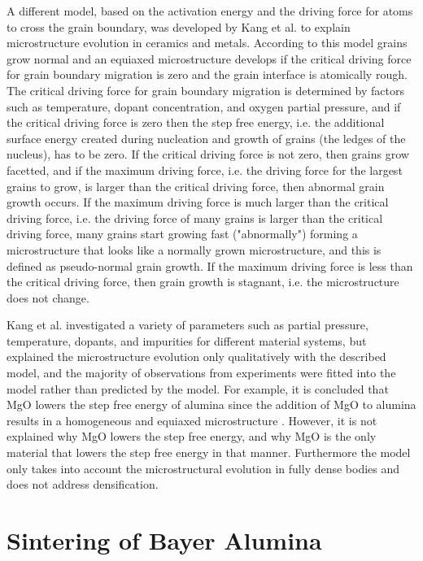 A different model, based on the activation energy and the driving force for atoms to cross the grain boundary, was developed by Kang et al. \cite{Kang2004,Kang2009,Kang2016} to explain microstructure evolution in ceramics and metals. According to this model grains grow normal and an equiaxed microstructure develops if the critical driving force for grain boundary migration is zero and the grain interface is atomically rough. The critical driving force for grain boundary migration is determined by factors such as temperature, dopant concentration, and oxygen partial pressure, and if the critical driving force is zero then the step free energy, i.e. the additional surface energy created during nucleation and growth of grains (the ledges of the nucleus), has to be zero. If the critical driving force is not zero, then grains grow facetted, and if the maximum driving force, i.e. the driving force for the largest grains to grow, is larger than the critical driving force, then abnormal grain growth occurs. If the maximum driving force is much larger than the critical driving force, i.e. the driving force of many grains is larger than the critical driving force, many grains start growing fast ("abnormally") forming a microstructure that looks like a normally grown microstructure, and this is defined as pseudo-normal grain growth. If the maximum driving force is less than the critical driving force, then grain growth is stagnant, i.e. the microstructure does not change. 

Kang et al. \cite{Kang2016,Kang2009} investigated a variety of parameters such as partial pressure, temperature, dopants, and impurities for different material systems, but explained the microstructure evolution only qualitatively with the described model, and the majority of observations from experiments were fitted into the model rather than predicted by the model. For example, it is concluded that MgO lowers the step free energy of alumina since the addition of MgO to alumina results in a homogeneous and equiaxed microstructure \cite{Jo2006}. However, it is not explained why MgO lowers the step free energy, and why MgO is the only material that lowers the step free energy in that manner. Furthermore the model only takes into account the microstructural evolution in fully dense bodies and does not address densification.

\section{Sintering of Bayer Alumina}

